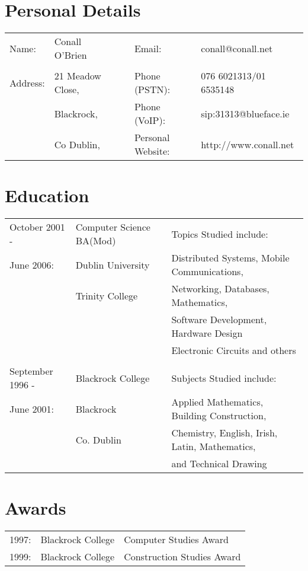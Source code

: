 \documentclass[a4paper, 11pt] {article}
\begin{document}
\section*{Personal Details}

\begin{tabular}{l l l l l}
Name: 	& Conall O'Brien		&	&	Email: 				& conall@conall.net 	  	\\	
			&							&	&							&								\\
Address:	& 21 Meadow Close, 	&	&	Phone (PSTN):		& 076 6021313/01 6535148\\
			& Blackrock,			&	&	Phone (VoIP):		& sip:31313@blueface.ie	\\
			& Co Dublin, 		 	&  &	Personal Website:	& http://www.conall.net	\\
\end{tabular}

\section*{Education}

\begin{tabular}{l l l l}
October 2001 - 		& Computer Science BA(Mod)	&	&	Topics Studied include:				\\
June 2006:				& 	Dublin University 		&	&	Distributed Systems, Mobile Communications,\\
							& 	Trinity College 			&	& 	Networking, Databases, Mathematics, \\ 
							&									&	&	Software Development, Hardware Design \\
						 	&									&	&	Electronic Circuits and others	\\	
							&									&	&	\\
September 1996 - 		& Blackrock College			&	&	Subjects Studied include:\\
June 2001:				& Blackrock						&	&	Applied Mathematics, Building Construction, \\ 
							& Co. Dublin 					&	&	Chemistry, English, Irish, Latin, Mathematics, \\
							&									&	&	and Technical Drawing \\
\end{tabular}

\section*{Awards}

\begin{tabular}{l l l}
1997:	& Blackrock College	 & 	Computer Studies Award 		\\
1999:	& Blackrock College 	 & 	Construction Studies Award	\\
\end{tabular}
\end{document}
